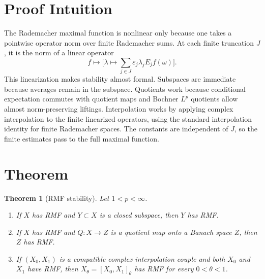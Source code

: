 \documentclass[11pt]{article}
\newtheorem{theorem}{Theorem}
\begin{document}
\section*{Proof Intuition}

The Rademacher maximal function is nonlinear only because one takes a pointwise operator norm over finite Rademacher sums.  At each finite truncation \(J\), it is the norm of a linear operator
\[
f \mapsto \bigl[\lambda \mapsto \sum_{j\in J}\varepsilon_j\lambda_j E_j f(\omega)\bigr].
\]
This linearization makes stability almost formal.  Subspaces are immediate because averages remain in the subspace.  Quotients work because conditional expectation commutes with quotient maps and Bochner \(L^p\) quotients allow almost norm-preserving liftings.  Interpolation works by applying complex interpolation to the finite linearized operators, using the standard interpolation identity for finite Rademacher spaces.  The constants are independent of \(J\), so the finite estimates pass to the full maximal function.

\section*{Theorem}

\begin{theorem}[RMF stability]
\label{thm:stability}
Let \(1<p<\infty\).
\begin{enumerate}
\item If \(X\) has RMF and \(Y\subset X\) is a closed subspace, then \(Y\) has RMF.
\item If \(X\) has RMF and \(Q:X\to Z\) is a quotient map onto a Banach space \(Z\), then \(Z\) has RMF.
\item If \((X_0,X_1)\) is a compatible complex interpolation couple and both \(X_0\) and \(X_1\) have RMF, then \(X_\theta=[X_0,X_1]_\theta\) has RMF for every \(0<\theta<1\).
\end{enumerate}
\end{theorem}
\end{document}
